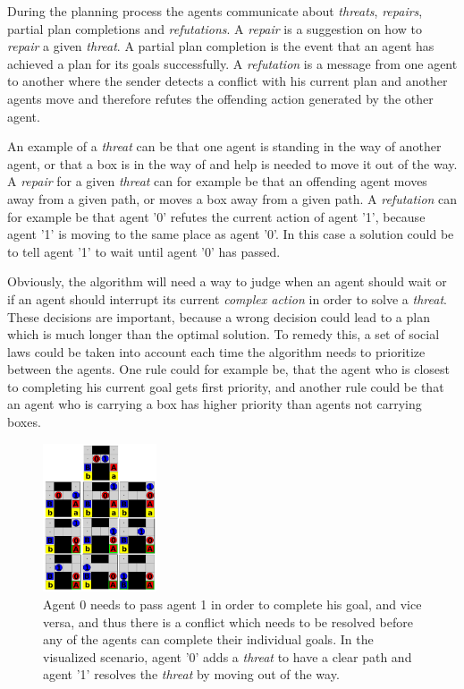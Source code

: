 \documentclass[Main]{subfiles}
\begin{document}
During the planning process the agents communicate about \textit{threats}, \textit{repairs}, partial plan completions and \textit{refutations}.
A \textit{repair} is a suggestion on how to \textit{repair} a given \textit{threat}.
A partial plan completion is the event that an agent has achieved a plan for its goals successfully.
A \textit{refutation} is a message from one agent to another where the sender detects a conflict with his current plan and another agents move and therefore refutes the offending action generated by the other agent.

An example of a \textit{threat} can be that one agent is standing in the way of another agent, or that a box is in the way of and help is needed to move it out of the way.
A \textit{repair} for a given \textit{threat} can for example be that an offending agent moves away from a given path, or moves a box away from a given path.
A \textit{refutation} can for example be that agent '0' refutes the current action of agent '1', because agent '1' is moving to the same place as agent '0'. In this case a solution could be to tell agent '1' to wait until agent '0' has passed.

Obviously, the algorithm will need a way to judge when an agent should wait or if an agent should interrupt its current \textit{complex action} in order to solve a \textit{threat}. These decisions are important, because a wrong decision could lead to a plan which is much longer than the optimal solution.
To remedy this, a set of social laws could be taken into account each time the algorithm needs to prioritize between the agents.
One rule could for example be, that the agent who is closest to completing his current goal gets first priority, and another rule could be that an agent who is carrying a box has higher priority than agents not carrying boxes.

\begin{figure}[h!]
	\centering
	\includegraphics[width=0.3\textwidth]{plan_collab.png}
	\caption{Agent 0 needs to pass agent 1 in order to complete his goal, and vice versa, and thus there is a conflict which needs to be resolved before any of the agents can complete their individual goals. In the visualized scenario, agent '0' adds a \textit{threat} to have a clear path and agent '1' resolves the \textit{threat} by moving out of the way.}
	\label{fig:plan_collab}
\end{figure}
\end{document}
